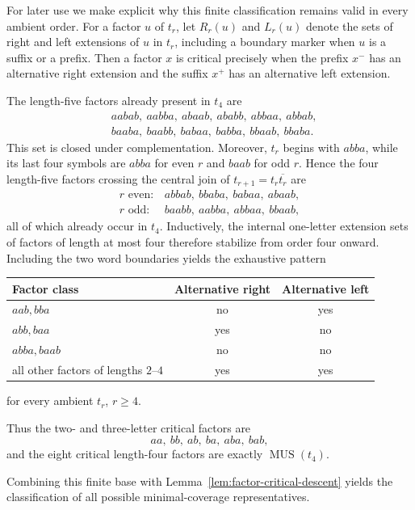 \documentclass[11pt,a4paper]{article}
\theoremstyle{definition}\newtheorem{definition}[theorem]{Definition}
\theoremstyle{remark}\newtheorem{remark}[theorem]{Remark}
\newcommand{\MUS}{\operatorname{MUS}}
\begin{document}
For later use we make explicit why this finite classification remains valid in every ambient order.  For a factor $u$ of $t_r$, let $R_r(u)$ and $L_r(u)$ denote the sets of right and left extensions of $u$ in $t_r$, including a boundary marker when $u$ is a suffix or a prefix.  Then a factor $x$ is critical precisely when the prefix $x^-$ has an alternative right extension and the suffix $x^+$ has an alternative left extension.

The length-five factors already present in $t_4$ are
\begin{align*}
 &aabab,\ aabba,\ abaab,\ ababb,\ abbaa,\ abbab,\\
 &baaba,\ baabb,\ babaa,\ babba,\ bbaab,\ bbaba.
\end{align*}
This set is closed under complementation.  Moreover, $t_r$ begins with $abba$, while its last four symbols are $abba$ for even $r$ and $baab$ for odd $r$.  Hence the four length-five factors crossing the central join of $t_{r+1}=t_r\overline{t_r}$ are
\[
 \begin{array}{ll}
 r\text{ even}:& abbab,\ bbaba,\ babaa,\ abaab,\\
 r\text{ odd}:& baabb,\ aabba,\ abbaa,\ bbaab,
 \end{array}
\]
all of which already occur in $t_4$.  Inductively, the internal one-letter extension sets of factors of length at most four therefore stabilize from order four onward.  Including the two word boundaries yields the exhaustive pattern
\begin{center}
\begin{tabular}{lcc}
\toprule
Factor class & Alternative right & Alternative left\\
\midrule
$aab,bba$ & no & yes\\
$abb,baa$ & yes & no\\
$abba,baab$ & no & no\\
all other factors of lengths $2$--$4$ & yes & yes\\
\bottomrule
\end{tabular}
\end{center}
for every ambient $t_r$, $r\ge4$.

Thus the two- and three-letter critical factors are
\[
 aa,\ bb,\ ab,\ ba,\ aba,\ bab,
\]
and the eight critical length-four factors are exactly $\MUS(t_4)$.

Combining this finite base with Lemma~\ref{lem:factor-critical-descent} yields the classification of all possible minimal-coverage representatives.
\end{document}
